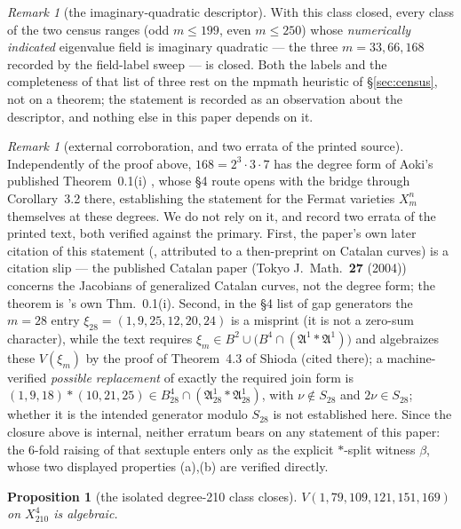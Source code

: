 \documentclass[11pt]{amsart}
\newtheorem{proposition}[theorem]{Proposition}
\theoremstyle{remark}
\newtheorem{remark}[theorem]{Remark}
\newcommand{\V}{V}
\begin{document}
\begin{remark}[the imaginary-quadratic descriptor]\label{rem:imq}
With this class closed, every class of the two census ranges (odd $m\le199$, even $m\le250$)
whose \emph{numerically indicated} eigenvalue field is imaginary quadratic --- the three
$m=33,66,168$ recorded by the field-label sweep --- is closed. Both the labels and the
completeness of that list of three rest on the mpmath heuristic of \S\ref{sec:census}, not on a
theorem; the statement is recorded as an observation about the descriptor, and nothing else in
this paper depends on it.
\end{remark}

\begin{remark}[external corroboration, and two errata of the printed source]\label{rem:aoki168}
Independently of the proof above, $168=2^3\cdot3\cdot7$ has the degree form of Aoki's published
Theorem~0.1(i) \cite{Aoki00}, whose \S4 route opens with the bridge through Corollary~3.2 there,
establishing the statement for the Fermat varieties $X^n_m$ themselves at these degrees. We do
not rely on it, and record two errata of the printed text, both verified against the primary.
First, the paper's own later citation of this statement (\cite[Thm.~1.2(ii)]{Aoki02}, attributed
to a then-preprint on Catalan curves) is a citation slip --- the published Catalan paper (Tokyo
J.\ Math.\ \textbf{27} (2004)) concerns the Jacobians of generalized Catalan curves, not the
degree form; the theorem is \cite{Aoki00}'s own Thm.~0.1(i). Second, in the \S4 list of gap
generators the $m=28$ entry $\xi_{28}=(1,9,25,12,20,24)$ is a misprint (it is not a zero-sum
character), while the text requires $\xi_m\in B^2\cup\bigl(B^4\cap(\mathfrak A^1*\mathfrak
A^1)\bigr)$ and algebraizes these $\V(\xi_m)$ by the proof of Theorem~4.3 of Shioda
\cite{Shioda81} (cited there); a machine-verified \emph{possible replacement} of exactly the
required join form is $(1,9,18)\ast(10,21,25)\in B^4_{28}\cap(\mathfrak A^1_{28}*\mathfrak
A^1_{28})$, with $\nu\notin S_{28}$ and $2\nu\in S_{28}$; whether it is the intended generator
modulo $S_{28}$ is not established here. Since the closure above is internal, neither erratum
bears on any statement of this paper: the $6$-fold raising of that sextuple enters only as the
explicit $*$-split witness $\beta$, whose two displayed properties (a),(b) are verified directly.
\end{remark}

\begin{proposition}[the isolated degree-210 class closes]\label{prop:w210}
$\V(1,79,109,121,151,169)$ on $X^4_{210}$ is algebraic.
\end{proposition}
\end{document}
